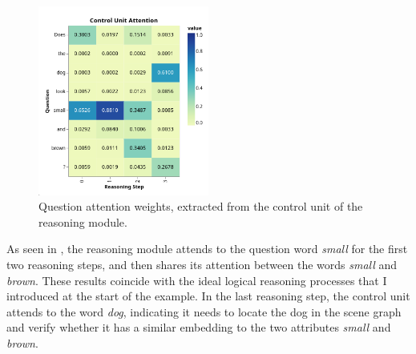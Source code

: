 \begin{figure}
    \centering
    \includegraphics[width=0.5\textwidth]{figures/positive_logical/positive_logical_control_attn.png}
    \caption[Question attention weights, extracted from the control unit of the reasoning module.]{Question attention weights, extracted from the control unit of the reasoning module.}
    \label{fig:positive_logical_control_attn}
\end{figure}

As seen in \figureautorefname{ \ref{fig:positive_logical_control_attn}}, the reasoning module attends to the question word \textit{small} for the first two reasoning steps, and then shares its attention between the words \textit{small} and \textit{brown}. These results coincide with the ideal logical reasoning processes that I introduced at the start of the example. In the last reasoning step, the control unit attends to the word \textit{dog}, indicating it needs to locate the dog in the scene graph and verify whether it has a similar embedding to the two attributes \textit{small} and \textit{brown}. 

